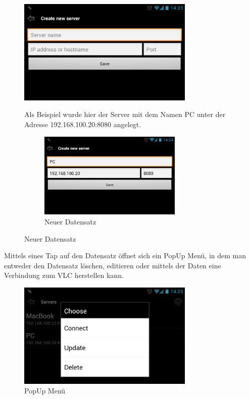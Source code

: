 \documentclass[a4paper,12pt]{article}
\begin{document}
\begin{figure}[H]
\centering
\includegraphics[width=0.75\textwidth]{Screenshot_3.png}
\caption{Neuen Server anlegen}
Als Beispiel wurde hier der Server mit dem Namen PC unter der Adresse 192.168.100.20:8080 angelegt.
\begin{figure}[H]
\centering
\includegraphics[width=0.75\textwidth]{Screenshot_5.png}
\caption{Neuer Datensatz}
\end{figure}
\end{figure}
Mittels eines Tap auf den Datensatz öffnet sich ein PopUp Menü, in dem man entweder den Datensatz löschen, editieren oder mittels der Daten eine Verbindung zum VLC herstellen kann.
\begin{figure}[H]
\centering
\includegraphics[width=0.75\textwidth]{Screenshot_4.png}
\caption{PopUp Menü}
\end{figure}
\end{document}
